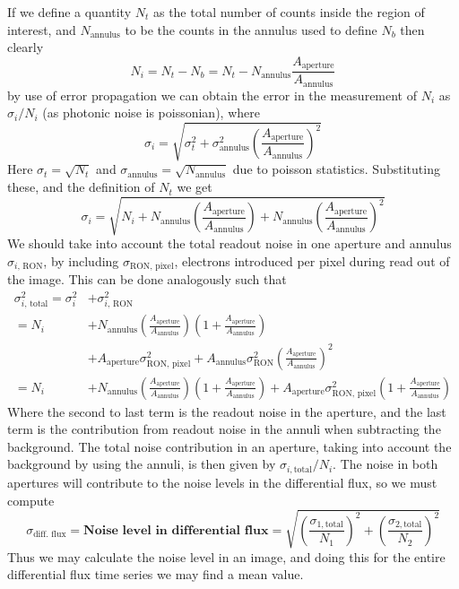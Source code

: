 \documentclass[../main.tex]{subfiles}
\begin{document}
If we define a quantity $N_t$ as the total number of counts inside the region of interest, and $N_\text{annulus}$ to be the counts in the annulus used to define $N_b$ then clearly
\begin{equation}
	N_i = N_t - N_b = N_t - N_\text{annulus}\frac{A_\text{aperture}}{A_\text{annulus}}
\end{equation}
by use of error propagation we can obtain the error in the measurement of $N_i$ as $\sigma_i / N_i$ (as photonic noise is poissonian), where
\begin{equation}
	\sigma_i = \sqrt{\sigma_t^2 + \sigma_\text{annulus}^2\left(\frac{A_\text{aperture}}{A_\text{annulus}}\right)^2}
\end{equation}
Here $\sigma_t = \sqrt{N_t}$ and $\sigma_\text{annulus} = \sqrt{N_\text{annulus}}$ due to poisson statistics. Substituting these, and the definition of $N_t$ we get
\begin{equation}
	\sigma_i = \sqrt{N_i + N_\text{annulus}\left( \frac{A_\text{aperture}}{A_\text{annulus}}\right) + N_\text{annulus}\left( \frac{A_\text{aperture}}{A_\text{annulus}}\right)^2}
\end{equation}
We should take into account the total readout noise in one aperture and annulus $\sigma_\text{$i$, RON}$, by including $\sigma_\text{RON, pixel}$, electrons introduced per pixel during read out of the image. This can be done analogously such that
\begin{align}
	\sigma_\text{$i$, total}^2 = \sigma_i^2 &+ \sigma_\text{$i$, RON}^2 \\\nonumber= N_i &+ N_\text{annulus}\left( \frac{A_\text{aperture}}{A_\text{annulus}}\right)\left(1+ \frac{A_\text{aperture}}{A_\text{annulus}}\right) \\ &+ A_\text{aperture}\sigma^2_\text{RON, pixel} + A_\text{annulus}\sigma^2_\text{RON}\left(\frac{A_\text{aperture}}{A_\text{annulus}}\right)^2\nonumber
	\\ = N_i &+ N_\text{annulus}\left( \frac{A_\text{aperture}}{A_\text{annulus}}\right)\left(1+ \frac{A_\text{aperture}}{A_\text{annulus}}\right) + A_\text{aperture}\sigma^2_\text{RON, pixel}\left(1+ \frac{A_\text{aperture}}{A_\text{annulus}}\right)\nonumber
\end{align}
Where the second to last term is the readout noise in the aperture, and the last term is the contribution from readout noise in the annuli when subtracting the background. The total noise contribution in an aperture, taking into account the background by using the annuli, is then given by $\sigma_{i, \text{total}}/N_i$. The noise in both apertures will contribute to the noise levels in the differential flux, so we must compute 
\begin{equation}
	\sigma_\text{diff. flux} = \textbf{Noise level in differential flux} = \sqrt{\left(\frac{\sigma_{1,\text{total}}}{N_1}\right)^2 + \left(\frac{\sigma_{2,\text{total}}}{N_2}\right)^2}
\end{equation}
Thus we may calculate the noise level in an image, and doing this for the entire differential flux time series we may find a mean value.
\end{document}
